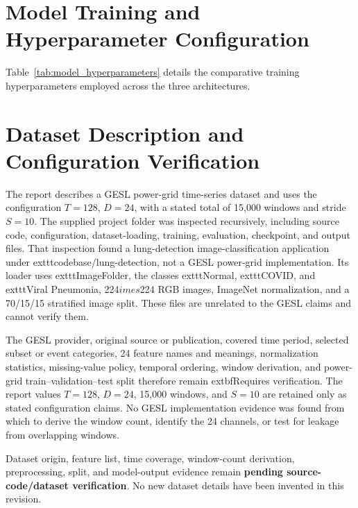 \documentclass[12pt,a4paper]{report}
\begin{document}
\section{Model Training and Hyperparameter Configuration}
Table~\ref{tab:model_hyperparameters} details the comparative training hyperparameters employed across the three architectures.

\section{Dataset Description and Configuration Verification}
The report describes a GESL power-grid time-series dataset and uses the configuration $T=128$, $D=24$, with a stated total of 15,000 windows and stride $S=10$. The supplied project folder was inspected recursively, including source code, configuration, dataset-loading, training, evaluation, checkpoint, and output files. That inspection found a lung-detection image-classification application under 	exttt{codebase/lung-detection}, not a GESL power-grid implementation. Its loader uses 	exttt{ImageFolder}, the classes 	exttt{Normal}, 	exttt{COVID}, and 	exttt{Viral Pneumonia}, 224$	imes$224 RGB images, ImageNet normalization, and a 70/15/15 stratified image split. These files are unrelated to the GESL claims and cannot verify them.

The GESL provider, original source or publication, covered time period, selected subset or event categories, 24 feature names and meanings, normalization statistics, missing-value policy, temporal ordering, window derivation, and power-grid train--validation--test split therefore remain 	extbf{Requires verification}. The report values $T=128$, $D=24$, 15,000 windows, and $S=10$ are retained only as stated configuration claims. No GESL implementation evidence was found from which to derive the window count, identify the 24 channels, or test for leakage from overlapping windows.

\begin{tcolorbox}[colback=lavenderLight,colframe=lavenderBorder,title=Verification note]
Dataset origin, feature list, time coverage, window-count derivation, preprocessing, split, and model-output evidence remain \textbf{pending source-code/dataset verification}. No new dataset details have been invented in this revision.
\end{tcolorbox}
\end{document}
